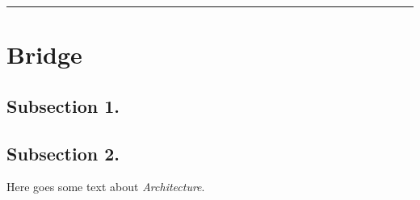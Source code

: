 \hrule
\section{Bridge}
\subsection{Subsection 1.}
\subsection{Subsection 2.}

Here goes some text about \emph{Architecture}. %
